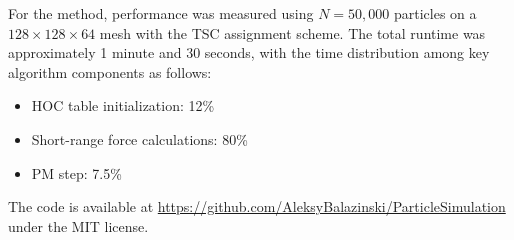 For the \PThreeM{} method, performance was measured using $N=50,000$ particles on a $128 \times 128 \times 64$ mesh with the TSC assignment scheme.
The total runtime was approximately 1 minute and 30 seconds, with the time distribution among key algorithm components as follows:
\begin{itemize}
    \item HOC table initialization: 12\%
    \item Short-range force calculations: 80\%
    \item PM step: 7.5\%
\end{itemize}
The code is available at \url{https://github.com/AleksyBalazinski/ParticleSimulation} under the MIT license.